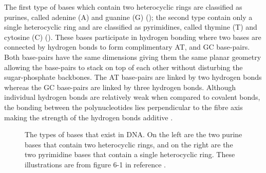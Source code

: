 %
The first type of bases which contain two heterocyclic rings are classified as purines, called adenine (A) and guanine (G) (); the second type contain only a single heterocyclic ring and are classified as pyrimidines, called thymine (T) and cytosine (C) (). These bases participate in hydrogen bonding where two bases are connected by hydrogen bonds to form complimentary AT, and GC base-pairs. Both base-pairs have the same dimensions giving them the same planar geometry allowing the base-pairs to stack on top of each other without disturbing the sugar-phosphate backbones. The AT base-pairs are linked by two hydrogen bonds whereas the GC base-pairs are linked by three hydrogen bonds. Although individual hydrogen bonds are relatively weak when compared to covalent bonds, the bonding between the polynucleotides lies perpendicular to the fibre axis making the strength of the hydrogen bonds additive \cite{Berg2010,Watson2003}.
%
\begin{figure}[t]
\centering
{}
\hspace{20mm}         
\caption{The types of bases that exist in DNA. On the left are the two purine bases that contain two heterocyclic rings, and on the right are the two pyrimidine bases that contain a single heterocyclic ring. These illustrations are from figure 6-1 in reference \cite{Watson2003}.} 
\label{fig:dna_bases}
\end{figure}
